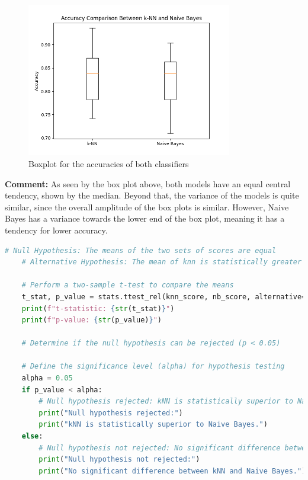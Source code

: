 \documentclass{article}
\begin{document}
  \begin{figure}[H]
    \centering
    \includegraphics[width=0.8\textwidth]{images/boxplot.png}
    \caption{Boxplot for the accuracies of both classifiers}
    \label{fig:boxplot}
  \end{figure}

  \textbf{Comment:}
  As seen by the box plot above, both models have an equal central tendency, shown by the median. Beyond that, the variance of the models is quite similar, since the overall amplitude of the box plots is similar. However, Naive Bayes has a variance towards the lower end of the box plot, meaning it has a tendency for lower accuracy.

  \begin{lstlisting}[language=Python]
    # Null Hypothesis: The means of the two sets of scores are equal
    # Alternative Hypothesis: The mean of knn is statistically greater than the mean of nb

    # Perform a two-sample t-test to compare the means
    t_stat, p_value = stats.ttest_rel(knn_score, nb_score, alternative='greater') # related samples, since both classifiers are tested on the same data
    print(f"t-statistic: {str(t_stat)}")
    print(f"p-value: {str(p_value)}")

    # Determine if the null hypothesis can be rejected (p < 0.05)

    # Define the significance level (alpha) for hypothesis testing
    alpha = 0.05
    if p_value < alpha:
        # Null hypothesis rejected: kNN is statistically superior to Naive Bayes
        print("Null hypothesis rejected:")
        print("kNN is statistically superior to Naive Bayes.")
    else:
        # Null hypothesis not rejected: No significant difference between kNN and Naive Bayes
        print("Null hypothesis not rejected:")
        print("No significant difference between kNN and Naive Bayes.")
  \end{lstlisting}
\end{document}
